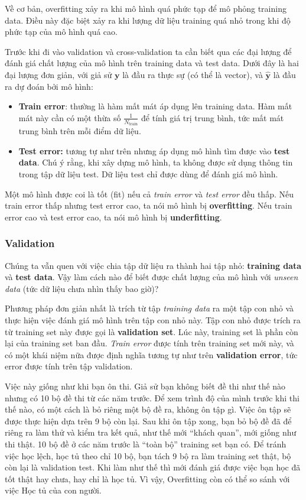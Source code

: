 \documentclass[../main-report.tex]{subfiles}
\begin{document}
Về cơ bản, overfitting xảy ra khi mô hình quá phức tạp để mô phỏng training data. Điều này đặc biệt xảy ra khi lượng dữ liệu training quá nhỏ trong khi độ phức tạp của mô hình quá cao.

Trước khi đi vào validation và cross-validation ta cần biết qua các đại lượng để đánh giá chất lượng của mô hình trên training data và test data. Dưới đây là hai đại lượng đơn giản, với giả sử \(\mathbf{y}\) là đầu ra thực sự (có thể là vector), và \(\mathbf{\hat{y}}\) là đầu ra dự đoán bởi mô hình:

\begin{itemize}
\item \textbf{Train error}: thường là hàm mất mát áp dụng lên training data. Hàm mất mát này cần có một thừa số \(\frac{1}{N_{\text{train}}} \) để tính giá trị trung bình, tức mất mát trung bình trên mỗi điểm dữ liệu.
\item \textbf{Test error:} tương tự như trên nhưng áp dụng mô hình tìm được vào \textbf{test data}. Chú ý rằng, khi xây dựng mô hình, ta không được sử dụng thông tin trong tập dữ liệu test. Dữ liệu test chỉ được dùng để đánh giá mô hình.
\end{itemize}

Một mô hình được coi là tốt (fit) nếu cả \emph{train error} và \emph{test error} đều thấp. Nếu train error thấp nhưng test error cao, ta nói mô hình bị \textbf{overfitting}. Nếu train error cao và test error cao, ta nói mô hình bị \textbf{underfitting}.

\subsubsection*{Validation}
Chúng ta vẫn quen với việc chia tập dữ liệu ra thành hai tập nhỏ: \textbf{training data} và \textbf{test data}. Vậy làm cách nào để biết được chất lượng của mô hình với \emph{unseen data} (tức dữ liệu chưa nhìn thấy bao giờ)?

Phương pháp đơn giản nhất là trích từ tập \emph{training data} ra một tập con nhỏ và thực hiện việc đánh giá mô hình trên tập con nhỏ này. Tập con nhỏ được trích ra từ training set này được gọi là \textbf{validation set}. Lúc này, training set là phần còn lại của training set ban đầu. \emph{Train error} được tính trên training set mới này, và có một khái niệm nữa được định nghĩa tương tự như trên \textbf{validation error}, tức error được tính trên tập validation.

Việc này giống như khi bạn ôn thi. Giả sử bạn không biết đề thi như thế nào nhưng có 10 bộ đề thi từ các năm trước. Để xem trình độ của mình trước khi thi thế nào, có một cách là bỏ riêng một bộ đề ra, không ôn tập gì. Việc ôn tập sẽ được thực hiện dựa trên 9 bộ còn lại. Sau khi ôn tập xong, bạn bỏ bộ đề đã để riêng ra làm thử và kiểm tra kết quả, như thế mới ``khách quan'', mới giống như thi thật. 10 bộ đề ở các năm trước là “toàn bộ” training set bạn có. Để tránh việc học lệch, học tủ theo chỉ 10 bộ, bạn tách 9 bộ ra làm training set thật, bộ còn lại là validation test. Khi làm như thế thì mới đánh giá được việc bạn học đã tốt thật hay chưa, hay chỉ là học tủ. Vì vậy, Overfitting còn có thể so sánh với việc Học tủ của con người.
\end{document}
